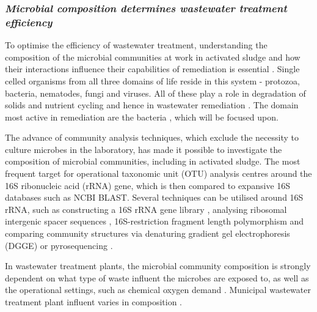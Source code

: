 \documentclass[11pt]{article}
\begin{document}
\subsubsection{\emph{Microbial composition determines wastewater treatment efficiency}}
To optimise the efficiency of wastewater treatment, understanding the composition of the microbial communities at work in activated sludge and how their interactions influence their capabilities of remediation is essential \cite{daims2006}.
Single celled organisms from all three domains of life reside in this system - protozoa, bacteria, nematodes, fungi and viruses. All of these play a role in degradation of solids and nutrient cycling and hence in wastewater remediation \cite{muchie2010bioremediation}. The domain most active in remediation are the bacteria \cite{spellman2008handbook}, which will be focused upon.


The advance of community analysis techniques, which exclude the necessity to culture microbes in the laboratory, has made it possible to investigate the composition of microbial communities, including in activated sludge. The most frequent target for operational taxonomic unit (OTU) analysis centres around the 16S ribonucleic acid (rRNA) gene, which is then compared to expansive 16S databases such as NCBI BLAST. Several techniques can be utilised around 16S rRNA, such as constructing a 16S rRNA gene library \cite{McGarvey_04}, analysing ribosomal intergenic spacer sequences \cite{Yu_01}, 16S-restriction fragment length polymorphism \cite{Gilbride_06} and comparing community structures via denaturing gradient gel electrophoresis (DGGE) \cite{Hesham_11} or pyrosequencing \cite{wang2012pyrosequencing}.


In wastewater treatment plants, the microbial community composition is strongly dependent on what type of waste influent the microbes are exposed to, as well as the operational settings, such as chemical oxygen demand \cite{Gilbride_06,wang2012pyrosequencing,hu2012microbial}. Municipal wastewater treatment plant influent varies in composition \citep{henze2002wastewater}.
\end{document}
